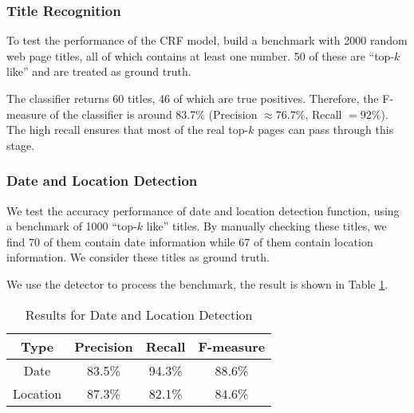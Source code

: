 \subsubsection{Title Recognition}
\label{sec:evalTitle}

To test the performance of the CRF model,
build a benchmark with 2000 random web page titles,
all of which contains at least one number.
50 of these are ``top-$k$ like'' and are treated as ground truth.

The classifier returns 60 titles, 46 of which are
true positives.
Therefore, the F-measure of the classifier is around 83.7\%
(Precision $\approx76.7\%$, Recall $=92\%$).
The high recall ensures that most of the real top-$k$ pages can pass
through this stage.

\subsubsection{Date and Location Detection}

We test the accuracy performance of date and location detection function,
using a benchmark of 1000 ``top-$k$ like'' titles.
By manually checking these titles,
we find 70 of them contain date information while 67 of them contain location information.
We consider these titles as ground truth.

We use the detector to process the benchmark, the result is shown in Table \ref{tab:whRes}.

\begin{table}
\centering
\caption{Results for Date and Location Detection}
\begin{tabular}{|c||c|c|c|}
\hline
Type  & Precision & Recall &  F-measure \\\hline
Date  & 83.5\% & 94.3\% & 88.6\%\\
Location & 87.3\% & 82.1\% & 84.6\%\\
\hline
\end{tabular}

\label{tab:whRes}
\end{table}


